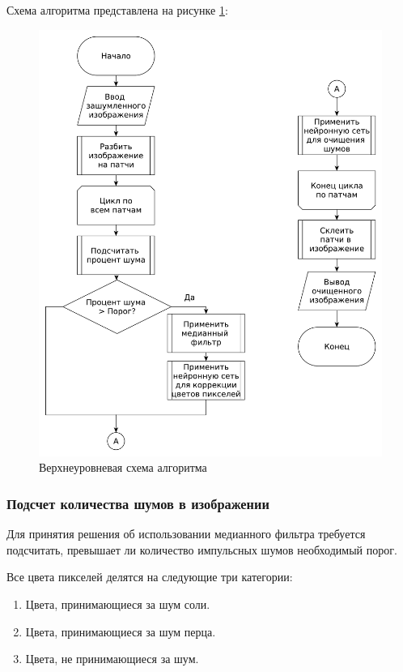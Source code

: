 Схема алгоритма представлена на рисунке \ref{contruct::mainAlgo}:
\FloatBarrier
\begin{figure}[h]	
	\begin{center}
		\includegraphics[width=\linewidth]{inc/pdf/mainAlgo.pdf}
	\end{center}
	\captionsetup{justification=centering}
	\caption{Верхнеуровневая схема алгоритма}
	\label{contruct::mainAlgo}
\end{figure}
\FloatBarrier

\subsubsection{Подсчет количества шумов в изображении}
Для принятия решения об использовании медианного фильтра требуется подсчитать, превышает ли количество импульсных шумов необходимый порог.

Все цвета пикселей делятся на следующие три категории:
\begin{enumerate}
	\item Цвета, принимающиеся за шум соли.
	\item Цвета, принимающиеся за шум перца.
	\item Цвета, не принимающиеся за шум.
\end{enumerate}

